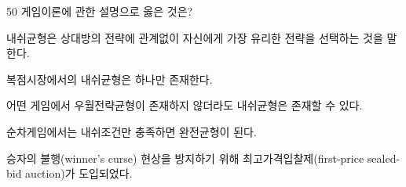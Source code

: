\begin{question}{50}
게임이론에 관한 설명으로 옳은 것은?
\begin{choices}
  \item 내쉬균형은 상대방의 전략에 관계없이 자신에게 가장 유리한 전략을 선택하는 것을 말한다.
  \item 복점시장에서의 내쉬균형은 하나만 존재한다.
  \item 어떤 게임에서 우월전략균형이 존재하지 않더라도 내쉬균형은 존재할 수 있다.
  \item 순차게임에서는 내쉬조건만 충족하면 완전균형이 된다.
  \item 승자의 불행(winner's curse) 현상을 방지하기 위해 최고가격입찰제(first-price sealed-bid auction)가 도입되었다.
\end{choices}
\end{question}
